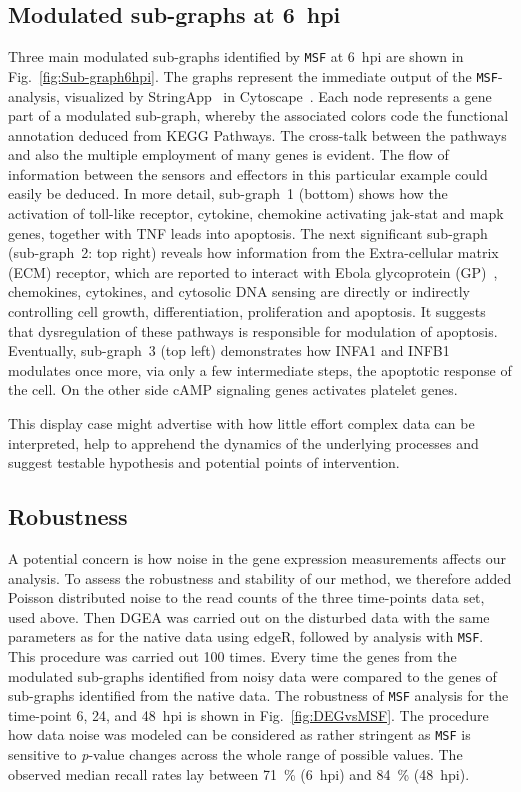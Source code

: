 \documentclass[10pt,a4paper,twocolumn]{article}
\begin{document}
	\subsection*{Modulated sub-graphs at 6~hpi}
	
	Three main modulated sub-graphs identified by \texttt{MSF} at 6~hpi are
	shown in Fig.~\ref{fig:Sub-graph6hpi}. The graphs represent the immediate output of the \texttt{MSF}-analysis,
	visualized by StringApp~\cite{StringApp} in Cytoscape~\cite{Cyto}. Each
	node represents a gene part of a modulated sub-graph, whereby the
	associated colors code the functional annotation deduced from KEGG
	Pathways. The cross-talk between the pathways and also the multiple
	employment of many genes is evident. The flow of information between
	the sensors and effectors in this particular example could easily be deduced.
	In more detail, sub-graph~1 (bottom) shows how the activation of toll-like
	receptor, cytokine, chemokine activating jak-stat and mapk genes, together with TNF leads into apoptosis. The next significant sub-graph (sub-graph~2: top right) reveals
	how information from the Extra-cellular matrix (ECM) receptor, which are
	reported to interact with Ebola glycoprotein (GP)~\cite{Veljkovic}, chemokines, cytokines, and cytosolic DNA sensing are directly or indirectly controlling cell growth, differentiation, proliferation and apoptosis. It suggests that dysregulation of these pathways is responsible for modulation of apoptosis. Eventually, sub-graph~3 (top left)
	demonstrates how INFA1 and INFB1 modulates once more, via only a few
	intermediate steps, the apoptotic response of the cell. On the other side cAMP signaling genes activates platelet genes.
	
	This display case might advertise with how little effort complex data
	can be interpreted, help to apprehend the dynamics of the underlying
	processes and suggest testable hypothesis and potential points of
	intervention.
	
	\subsection*{Robustness}
	
	A potential concern is how noise in the gene expression measurements
	affects our analysis. To assess the robustness and stability of our method,
	we therefore added Poisson distributed noise
	to the read counts of the three time-points data set, used above.
	Then DGEA was carried out on the disturbed data
	with the same parameters as for the native data using edgeR, followed by
	analysis with \texttt{MSF}. This procedure was carried out 100 times.
	Every time the genes from the modulated sub-graphs identified from noisy
	data were compared to the genes of sub-graphs identified from the native
	data. The robustness of \texttt{MSF} analysis
	for the time-point 6, 24, and 48~hpi is shown in
	Fig.~\ref{fig:DEGvsMSF}. The procedure how data noise was modeled can be
	considered as rather stringent as \texttt{MSF} is sensitive to \textit{p}-value
	changes across the whole range of possible values. The observed median recall rates lay
	between 71~\% (6~hpi) and 84~\% (48~hpi).
	
\end{document}
